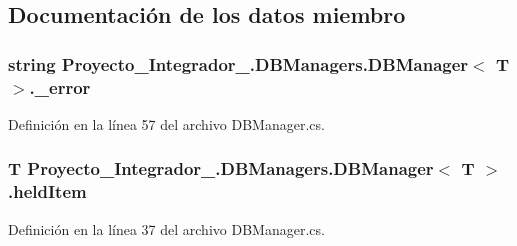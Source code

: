 \subsection{Documentación de los datos miembro}
\hypertarget{class_proyecto___integrador__3_1_1_d_b_managers_1_1_d_b_manager_3_01_t_01_4_a72ee684c84a301ba5a3c48f863bc950f}{
\subsubsection[{\-\_\-error}]{\setlength{\rightskip}{0pt plus 5cm}string Proyecto\-\_\-\-Integrador\-\_.\-D\-B\-Managers.\-D\-B\-Manager$<$ T $>$.\-\_\-error\hspace{0.3cm}{\ttfamily [private]}}}\label{class_proyecto___integrador__3_1_1_d_b_managers_1_1_d_b_manager_3_01_t_01_4_a72ee684c84a301ba5a3c48f863bc950f}


Definición en la línea 57 del archivo D\-B\-Manager.\-cs.

\hypertarget{class_proyecto___integrador__3_1_1_d_b_managers_1_1_d_b_manager_3_01_t_01_4_a3b67ae3b5b3b9c3793d56c1407d7dcff}{
\subsubsection[{held\-Item}]{\setlength{\rightskip}{0pt plus 5cm}T Proyecto\-\_\-\-Integrador\-\_.\-D\-B\-Managers.\-D\-B\-Manager$<$ T $>$.held\-Item\hspace{0.3cm}{\ttfamily [protected]}}}\label{class_proyecto___integrador__3_1_1_d_b_managers_1_1_d_b_manager_3_01_t_01_4_a3b67ae3b5b3b9c3793d56c1407d7dcff}


Definición en la línea 37 del archivo D\-B\-Manager.\-cs.

